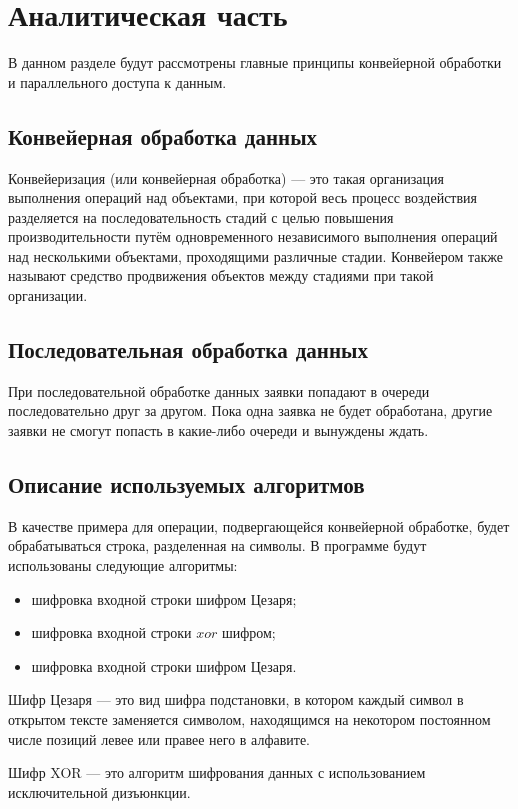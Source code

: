 \chapter{Аналитическая часть}

В данном разделе будут рассмотрены главные принципы конвейерной обработки и параллельного доступа к данным.

\section{Конвейерная обработка данных}
Конвейеризация (или конвейерная обработка) --- это такая организация выполнения операций над объектами, при которой весь процесс воздействия разделяется на последовательность стадий с целью повышения производительности путём одновременного независимого выполнения операций над несколькими объектами, проходящими различные стадии. Конвейером также называют средство продвижения объектов между стадиями при такой организации.

\section{Последовательная обработка данных}
При последовательной обработке данных заявки попадают в очереди последовательно друг за другом. Пока одна заявка не будет обработана, другие заявки не смогут попасть в какие-либо очереди и вынуждены ждать.

\section{Описание используемых алгоритмов}
В качестве примера для операции, подвергающейся конвейерной обработке, будет обрабатываться строка, разделенная на символы. 
\newpage
В программе будут использованы следующие алгоритмы:
\begin{itemize}
	\item шифровка входной строки шифром Цезаря;
\item шифровка входной строки $xor$ шифром;
\item шифровка входной строки шифром Цезаря.
\end{itemize} 

Шифр Цезаря --- это вид шифра подстановки, в котором каждый символ в открытом тексте заменяется символом, находящимся на некотором постоянном числе позиций левее или правее него в алфавите.

Шифр XOR --- это алгоритм шифрования данных с использованием исключительной дизъюнкции.

